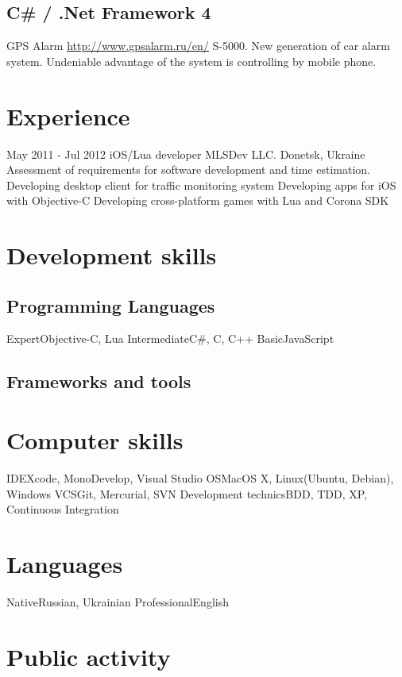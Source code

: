 \documentclass[11pt,a4paper]{moderncv}
\begin{document}
  \subsection{C\# / .Net Framework 4}
  \cvline
    {GPS Alarm}
    {\url{http://www.gpsalarm.ru/en/}\newline{}
    S-5000. New generation of car alarm system.\newline
    Undeniable advantage of the system is controlling by mobile phone.}

\section{Experience}
\cventry
  {May 2011 - Jul 2012}
  {iOS/Lua developer}
  {MLSDev LLC. Donetsk, Ukraine}
  {}{}
  {Assessment of requirements for software development and time estimation. 
  \newline  Developing desktop client for traffic monitoring system
  \newline{}Developing apps for iOS with Objective-C
  \newline{}Developing cross-platform games with Lua and Corona SDK}

\section{Development skills}
\subsection{Programming Languages}
\cvline
  {Expert}{Objective-C, Lua}
\cvline
  {Intermediate}{C\#, C, C++}
\cvline
  {Basic}{JavaScript}
\subsection{Frameworks and tools}

\section{Computer skills}
  \cvline
  {IDE}{Xcode, MonoDevelop, Visual Studio}
  \cvline
  {OS}{MacOS X, Linux(Ubuntu, Debian), Windows}
  \cvline
  {VCS}{Git, Mercurial, SVN}
  \cvline
  {Development technics}{BDD, TDD, XP, Continuous Integration}
    
\section{Languages}
 \cvline
  {Native}{Russian, Ukrainian}
\cvline
  {Professional}{English}

\section{Public activity}
\end{document}
